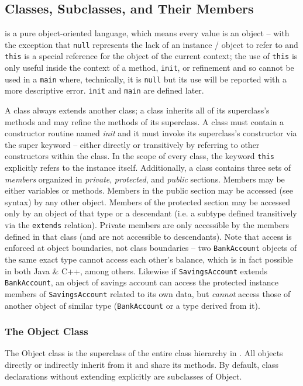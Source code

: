 \subsection{Classes, Subclasses, and Their Members}
\Lang{} is a pure object-oriented language, which means every value is an object -- with the exception that \verb!null! represents the lack of an instance / object to refer to and \verb!this! is a special reference for the object of the current context; the use of \verb!this! is only useful inside the context of a method, \verb!init!, or refinement and so cannot be used in a \verb!main! where, technically, it is \verb!null! but its use will be reported with a more descriptive error. \verb!init! and \verb!main! are defined later.

A class always extends another class; a class inherits all of its superclass's methods and may refine the methods of its superclass. A class must contain a constructor routine named \textit{init} and it must invoke its superclass's constructor via the super keyword -- either directly or transitively by referring to other constructors within the class. In the scope of every class, the keyword \verb!this! explicitly refers to the instance itself. Additionally, a class contains three sets of \textit{members} organized in \textit{private}, \textit{protected}, and \textit{public} sections. Members may be either variables or methods. Members in the public section may be accessed (see syntax) by any other object. Members of the protected section may be accessed only by an object of that type or a descendant (i.e. a subtype defined transitively via the \verb!extends! relation). Private members are only accessible by the members defined in that class (and are not accessible to descendants). Note that access is enforced at object boundaries, not class boundaries -- two \verb!BankAccount! objects of the same exact type cannot access each other's balance, which is in fact possible in both Java \& C++, among others. Likewise if \verb!SavingsAccount! extends \verb!BankAccount!, an object of savings account can access the protected instance members of \verb!SavingsAccount! related to its own data, but \emph{cannot} access those of another object of similar type (\verb!BankAccount! or a type derived from it).

\subsubsection{The Object Class}
The Object class is the superclass of the entire class hierarchy in \Lang{}. All objects directly or indirectly inherit from it and share its methods. By default, class declarations without extending explicitly are subclasses of Object.


